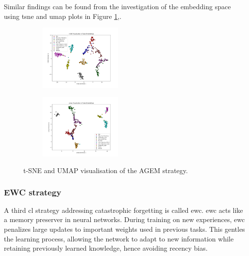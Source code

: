 Similar findings can be found from the investigation of the embedding space using \acrshort{tsne} and \acrshort{umap} plots in Figure \ref{fig:tsne_umap_AGEM},.

\begin{figure}[ht]
\centering
\begin{subfigure}
    \centering
    \includegraphics[width=0.45\textwidth]{Images/tSNE_AGEM_MultiView_testset_100epochs.png}
\end{subfigure}
\begin{subfigure}
    \centering
    \includegraphics[width=0.45\textwidth]{Images/umap_MultiView_AGEM_testset_100epochs.png}
\end{subfigure}
    \caption{t-SNE and UMAP visualisation of the AGEM strategy.}
    \label{fig:tsne_umap_AGEM}
\end{figure}
 
\newpage

\subsubsection{EWC strategy}
\label{subsubsec:RQ1_EWC}
A third \acrshort{cl} strategy addressing catastrophic forgetting is called \acrfull{ewc}. \acrshort{ewc} acts like a memory preserver in neural networks. During training on new experiences, \acrshort{ewc} penalizes large updates to important weights used in previous tasks. This gentles the learning process, allowing the network to adapt to new information while retaining previously learned knowledge, hence avoiding recency bias. \\


